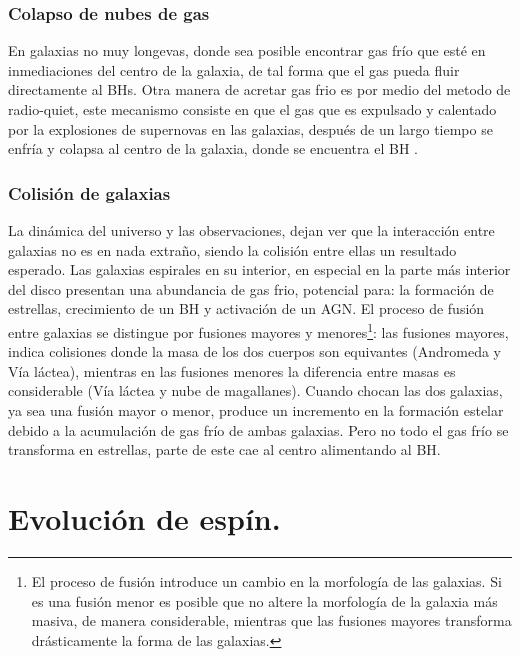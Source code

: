     \subsubsection{Colapso de nubes de gas}
    \label{subsubsec: colapso_nubes_gas}
En galaxias no muy longevas, donde sea posible encontrar gas frío que esté en inmediaciones del centro de la galaxia, de tal forma que el gas pueda fluir directamente al BHs. Otra manera de acretar gas frio es por medio del metodo de radio-quiet, este mecanismo consiste en que el gas que es expulsado y calentado por la explosiones de supernovas en las galaxias, después de un largo tiempo se enfría y colapsa al centro de la galaxia, donde se encuentra el BH \cite{fanidakis2011}.

    \subsubsection{Colisión de galaxias}
    \label{subsubsec: mergers_galaxys}
La dinámica del universo y las observaciones, dejan ver que la interacción entre galaxias no es en nada extraño, siendo la colisión entre ellas un resultado esperado. Las galaxias espirales en su interior, en especial en la parte más interior del disco presentan una abundancia de gas frio, potencial para: la formación de estrellas, crecimiento de un BH y activación de un AGN. El proceso de fusión entre galaxias se distingue por fusiones mayores y menores\footnote{El proceso de fusión introduce un cambio en la morfología de las galaxias. Si es una fusión menor es posible que no altere la morfología de la galaxia más masiva, de manera considerable, mientras que las fusiones mayores transforma drásticamente la forma de las galaxias. }: las fusiones mayores, indica colisiones donde la masa de los dos cuerpos son equivantes (Andromeda y Vía láctea), mientras en las fusiones menores la diferencia entre masas es considerable (Vía láctea y nube de magallanes). Cuando chocan las dos galaxias, ya sea una fusión mayor o menor, produce un incremento en la formación estelar debido a la acumulación de gas frío de ambas galaxias. Pero no todo el gas frío se transforma en estrellas, parte de este cae al centro alimentando al BH.

\section{Evolución de espín.}
\label{sec: Evolution_spin}

